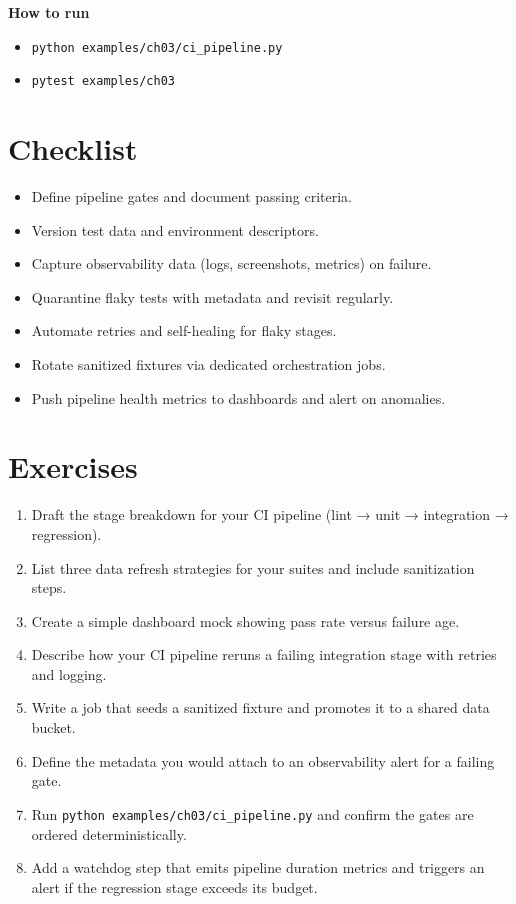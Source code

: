 \textbf{How to run}
\begin{itemize}
  \item \texttt{python examples/ch03/ci\_pipeline.py}
  \item \texttt{pytest examples/ch03}
\end{itemize}

\section{Checklist}

\begin{itemize}
  \item Define pipeline gates and document passing criteria.
  \item Version test data and environment descriptors.
  \item Capture observability data (logs, screenshots, metrics) on failure.
  \item Quarantine flaky tests with metadata and revisit regularly.
  \item Automate retries and self-healing for flaky stages.
  \item Rotate sanitized fixtures via dedicated orchestration jobs.
  \item Push pipeline health metrics to dashboards and alert on anomalies.
\end{itemize}

\section{Exercises}

\begin{enumerate}
  \item Draft the stage breakdown for your CI pipeline (lint → unit → integration → regression).
  \item List three data refresh strategies for your suites and include sanitization steps.
  \item Create a simple dashboard mock showing pass rate versus failure age.
  \item Describe how your CI pipeline reruns a failing integration stage with retries and logging.
  \item Write a job that seeds a sanitized fixture and promotes it to a shared data bucket.
  \item Define the metadata you would attach to an observability alert for a failing gate.
  \item Run \texttt{python examples/ch03/ci\_pipeline.py} and confirm the gates are ordered deterministically.
  \item Add a watchdog step that emits pipeline duration metrics and triggers an alert if the regression stage exceeds its budget.
\end{enumerate}

